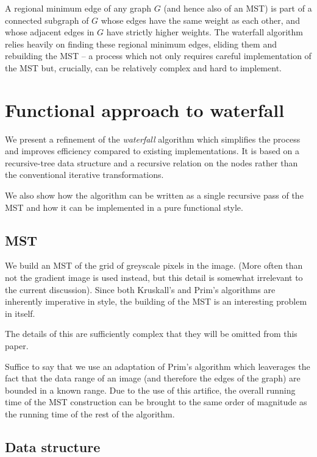 \documentclass{jfp}
\begin{document}
A regional minimum edge of any graph $G$ (and hence also of an MST) is
part of a connected subgraph of $G$ whose edges have the same weight
as each other, and whose adjacent edges in $G$ have strictly higher
weights. The waterfall algorithm relies heavily on finding these
regional minimum edges, eliding them and rebuilding the MST -- a
process which not only requires careful implementation of the MST but,
crucially, can be relatively complex and hard to implement.


\section{Functional approach to waterfall}


We present a refinement of the {\em waterfall\/} algorithm which
simplifies the process and improves efficiency compared to existing
implementations. It is based on a recursive-tree data structure and a
recursive relation on the nodes rather than the conventional iterative
transformations.

We also show how the algorithm can be written as a single recursive
pass of the MST and how it can be implemented in a pure functional
style.

\subsection{MST}

We build an MST of the grid of greyscale pixels in the image. (More
often than not the gradient image is used instead, but this detail is
somewhat irrelevant to the current discussion). Since both Kruskall's
and Prim's algorithms are inherently imperative in style, the building
of the MST is an interesting problem in itself.

The details of this are sufficiently complex that they will be omitted
from this paper.

Suffice to say that we use an adaptation of Prim's algorithm which
leaverages the fact that the data range of an image (and therefore the
edges of the graph) are bounded in a known range. Due to the use of
this artifice, the overall running
time of the MST construction can be brought to the same order of
magnitude as the running time of the rest of the algorithm.


\subsection{Data structure}
\end{document}
